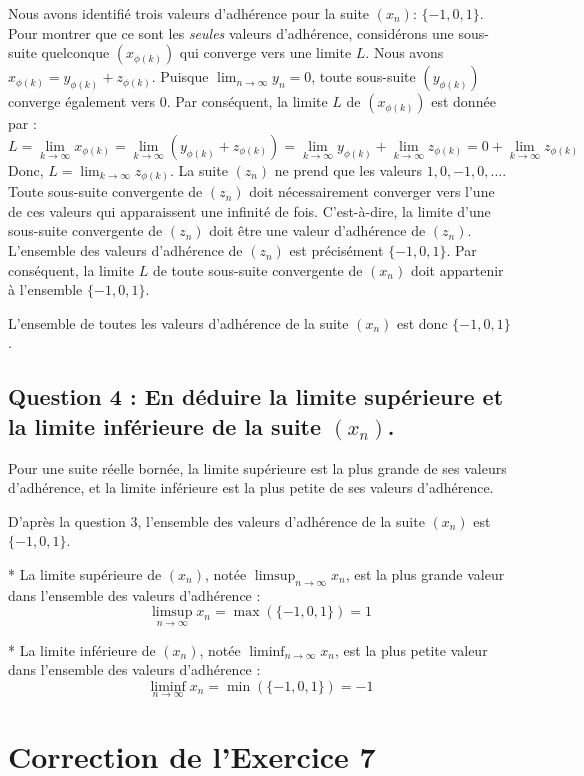 \documentclass{report}
\begin{document}
Nous avons identifié trois valeurs d'adhérence pour la suite $(x_n)$: $\{-1, 0, 1\}$.
Pour montrer que ce sont les \textit{seules} valeurs d'adhérence, considérons une sous-suite quelconque $(x_{\phi(k)})$ qui converge vers une limite $L$.
Nous avons $x_{\phi(k)} = y_{\phi(k)} + z_{\phi(k)}$.
Puisque $\lim_{n \to \infty} y_n = 0$, toute sous-suite $(y_{\phi(k)})$ converge également vers $0$.
Par conséquent, la limite $L$ de $(x_{\phi(k)})$ est donnée par :
$$L = \lim_{k \to \infty} x_{\phi(k)} = \lim_{k \to \infty} (y_{\phi(k)} + z_{\phi(k)}) = \lim_{k \to \infty} y_{\phi(k)} + \lim_{k \to \infty} z_{\phi(k)} = 0 + \lim_{k \to \infty} z_{\phi(k)}$$
Donc, $L = \lim_{k \to \infty} z_{\phi(k)}$.
La suite $(z_n)$ ne prend que les valeurs $1, 0, -1, 0, \dots$. Toute sous-suite convergente de $(z_n)$ doit nécessairement converger vers l'une de ces valeurs qui apparaissent une infinité de fois. C'est-à-dire, la limite d'une sous-suite convergente de $(z_n)$ doit être une valeur d'adhérence de $(z_n)$. L'ensemble des valeurs d'adhérence de $(z_n)$ est précisément $\{-1, 0, 1\}$.
Par conséquent, la limite $L$ de toute sous-suite convergente de $(x_n)$ doit appartenir à l'ensemble $\{-1, 0, 1\}$.

L'ensemble de toutes les valeurs d'adhérence de la suite $(x_n)$ est donc $\{-1, 0, 1\}$.

\section*{Question 4 : En déduire la limite supérieure et la limite inférieure de la suite $(x_n)$.}

Pour une suite réelle bornée, la limite supérieure est la plus grande de ses valeurs d'adhérence, et la limite inférieure est la plus petite de ses valeurs d'adhérence.

D'après la question 3, l'ensemble des valeurs d'adhérence de la suite $(x_n)$ est $\{-1, 0, 1\}$.

*   La limite supérieure de $(x_n)$, notée $\limsup_{n \to \infty} x_n$, est la plus grande valeur dans l'ensemble des valeurs d'adhérence :
    $$\limsup_{n \to \infty} x_n = \max(\{-1, 0, 1\}) = 1$$

*   La limite inférieure de $(x_n)$, notée $\liminf_{n \to \infty} x_n$, est la plus petite valeur dans l'ensemble des valeurs d'adhérence :
    $$\liminf_{n \to \infty} x_n = \min(\{-1, 0, 1\}) = -1$$

\newpage


\chapter*{Correction de l'Exercice 7}
\end{document}
